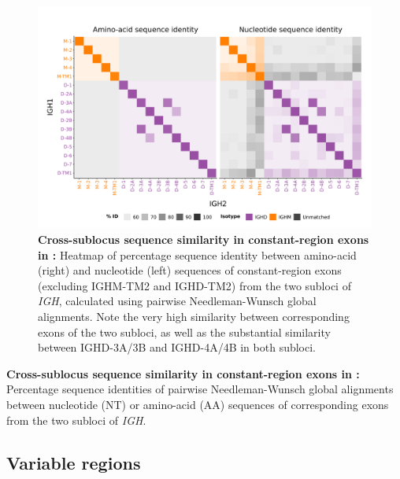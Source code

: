 	\begin{figure}
	\centering
	\includegraphics[width = \textwidth]{_Figures/png/nfu-ch-aln}
	\caption[Cross-sublocus sequence similarity in constant-region exons in \Nfu \textit{IGH}]{\textbf{Cross-sublocus sequence similarity in constant-region exons in \Nfu:} Heatmap of percentage sequence identity between amino-acid (right) and nucleotide (left) sequences of constant-region exons (excluding IGHM-TM2 and IGHD-TM2) from the two subloci of \Nfu \textit{IGH}, calculated using pairwise Needleman-Wunsch global alignments. Note the very high similarity between corresponding exons of the two subloci, as well as the substantial similarity between IGHD-3A/3B and IGHD-4A/4B in both subloci.}
	\label{fig:nfu-ch-aln}
	\end{figure}
	
	\begin{table}\centering
		\caption[Cross-sublocus sequence similarity between corresponding constant-region exons in \Nfu \textit{IGH}]{\textbf{Cross-sublocus sequence similarity in constant-region exons in \Nfu:} Percentage sequence identities of pairwise Needleman-Wunsch global alignments between nucleotide (NT) or amino-acid (AA) sequences of corresponding exons from the two subloci of \Nfu \textit{IGH}.}
	
	\label{tab:nfu-ch-aln}
	\end{table}
	




	\subsection{Variable regions}
	\label{sec:nfu-locus-variable}
	
